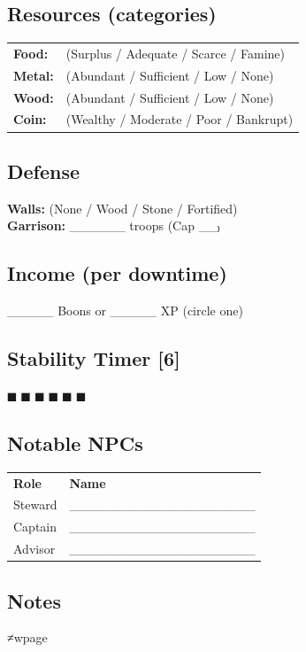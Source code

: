 \documentclass[11pt]{article}
\begin{document}
\subsection*{Resources (categories)}
\begin{tabularx}{\textwidth}{l X}
\textbf{Food:} & (Surplus / Adequate / Scarce / Famine) \\
\textbf{Metal:} & (Abundant / Sufficient / Low / None) \\
\textbf{Wood:} & (Abundant / Sufficient / Low / None) \\
\textbf{Coin:} & (Wealthy / Moderate / Poor / Bankrupt) \\
\end{tabularx}

\subsection*{Defense}
\textbf{Walls:} (None / Wood / Stone / Fortified) \\
\textbf{Garrison:} ______ troops (Cap __₎

\subsection*{Income (per downtime)}
\noindent _____ Boons or _____ XP (circle one)

\subsection*{Stability Timer [6]}
$■$ $■$ $■$ $■$ $■$ $■$

\subsection*{Notable NPCs}
\small
\begin{tabularx}{\textwidth}{p{3.5cm} X}
\textbf{Role} & \textbf{Name} \\
Steward & ____________________ \\
Captain & ____________________ \\
Advisor & ____________________ \\
\end{tabularx}
\normalsize

\subsection*{Notes}
\vspace{5cm}
≠wpage
\end{document}
